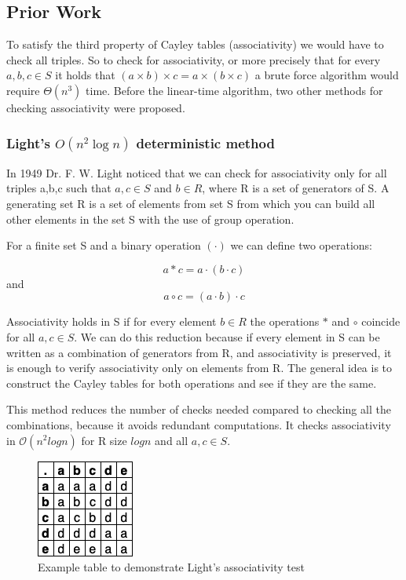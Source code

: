 \documentclass[sigconf]{acmart}
\begin{document}
\subsection{Prior Work}
To satisfy the third property of Cayley tables (associativity) we would have to check all triples. So to check for associativity, or more precisely that for every \(a,b,c  \in S\) it holds that \((a\times b)\times c = a\times (b\times c)\) a brute force algorithm would require \(\Theta(n^3)\) time. Before the linear-time algorithm, two other methods for checking associativity were proposed.
\subsubsection{Light's \( O(n^2 \log n) \) deterministic method}
In 1949 Dr. F. W. Light noticed that we can check for associativity only for all triples a,b,c such that \(a,c \in S\) and \(b\in R\), where R is a set of generators of S. A generating set R is a set of elements from set S from which you can build all other elements in the set S with the use of group operation. 

For a finite set S and a binary operation \((\cdot)\) we can define two operations:

\[a * c = a\cdot(b\cdot c)\] and
\[a \circ c= (a\cdot b)\cdot c\]

Associativity holds in S if for every element \(b \in R\) the operations \(*\) and \(\circ\) coincide for all \(a,c \in S\). We can do this reduction because if every element in S can be written as a combination of generators from R, and associativity is preserved, it is enough to verify associativity only on elements from R.
The general idea is to construct the Cayley tables for both operations and see if they are the same.

This method reduces the number of checks needed compared to checking all the combinations, because it avoids redundant computations. It checks associativity in \(\mathcal{O}(n^2logn)\) for R size \(logn\) and all \(a,c \in S\).

\begin{figure}[H]
    \centering
    \includegraphics[width=0.125\linewidth]{original_table.png}
    \caption{Example table to demonstrate Light's associativity test}
\end{figure}
\end{document}
